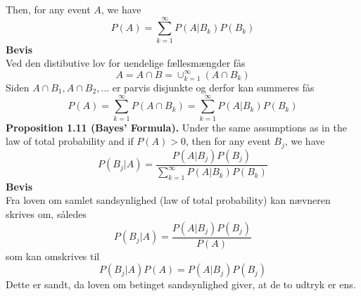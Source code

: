 \documentclass[12pt,a4paper]{report}
\begin{document}
Then, for any event $A$, we have
\begin{equation}
P(A)=\sum_{k=1}^{\infty}P(A|B_k)P(B_k)
\end{equation}
\textbf{Bevis}\\
Ved den distibutive lov for uendelige fællesmængder fås
\begin{equation}
A=A\cap B=\cup_{k=1}^{\infty}(A\cap B_k)
\end{equation}
Siden $A\cap B_1,A\cap B_2,\ldots$ er parvis disjunkte og derfor kan summeres fås
\begin{equation}
P(A)=\sum_{k=1}^{\infty}P(A\cap B_k)=\sum_{k=1}^{\infty}P(A|B_k)P(B_k)
\end{equation}
\textbf{Proposition 1.11 (Bayes' Formula).} Under the same assumptions as in the law of total probability and if $P(A)>0$, then for any event $B_j$, we have
\begin{equation}
P(B_j|A)=\frac{P(A|B_j)P(B_j)}{\sum_{k=1}^{\infty}P(A|B_k)P(B_k)}
\end{equation}
\textbf{Bevis}\\
Fra loven om samlet sandsynlighed (law of total probability) kan nævneren skrives om, således
\begin{equation}
P(B_j|A)=\frac{P(A|B_j)P(B_j)}{P(A)}
\end{equation}
som kan omskrives til
\begin{equation}
P(B_j|A)P(A)=P(A|B_j)P(B_j)
\end{equation}
Dette er sandt, da loven om betinget sandsynlighed giver, at de to udtryk er ens.
\end{document}
